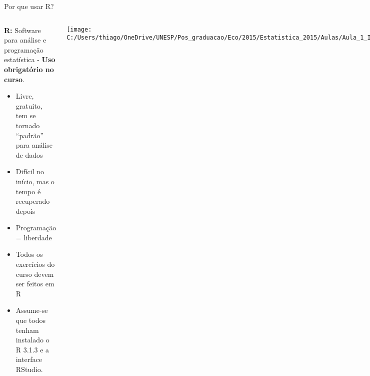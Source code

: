 \documentclass{beamer}\usepackage[]{graphicx}\usepackage[]{color}
\begin{document}
\begin{frame}[t]{Por que usar R?}

\begin{columns}[t]

\column{2.5in}
\begin{footnotesize}

\textbf{R:} Software para análise e programação estatística - \textbf{Uso obrigatório no curso}. 

\begin{itemize}

	\item Livre, gratuito, tem se tornado ``padrão'' para análise de dados
      
  \item	Difícil no início, mas o tempo é recuperado depois
    
	\item	Programação =  liberdade 
	
  \item Todos os exercícios do curso devem ser feitos em R
		
  \item	Assume-se que todos tenham instalado o R 3.1.3 e a interface RStudio.
	
  \end{itemize}
	
  \end{footnotesize}
  
\column{1.5in}
	
	\centering
	\texttt{[image: C:/Users/thiago/OneDrive/UNESP/Pos\_graduacao/Eco/2015/Estatistica\_2015/Aulas/Aula\_1\_Intro\_2015/figs/crybaby.jpg]}
	
	\tiny{http://www.jillgreenberg.com/}
	
\end{columns}
	
\end{frame}


% 
% 
% 
% 
% 
% 
% 
%   
%   



\end{document}
